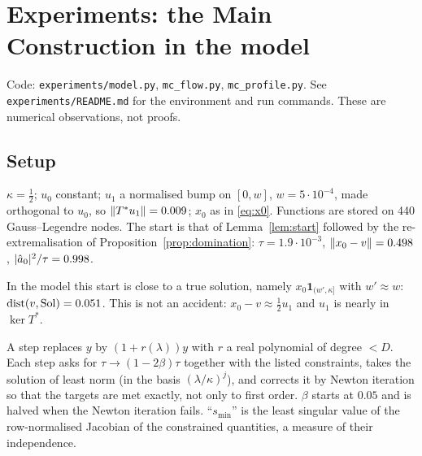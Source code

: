 \section{Experiments: the Main Construction in the model}\label{sec:experiments}

Code: \texttt{experiments/model.py}, \texttt{mc\_flow.py}, \texttt{mc\_profile.py}.
See \texttt{experiments/README.md} for the environment and run commands.
These are numerical observations, not proofs.

\subsection*{Setup}
$\kappa=\frac12$; $u_0$ constant; $u_1$ a normalised bump on $[0,w]$, $w=5\cdot10^{-4}$, made
orthogonal to $u_0$, so $\lVert T^*u_1\rVert=0.009$; $x_0$ as in \eqref{eq:x0}. Functions are stored on
440 Gauss--Legendre nodes. The start is that of Lemma~\ref{lem:start} followed by the
re-extremalisation of Proposition~\ref{prop:domination}:
$\tau=1.9\cdot10^{-3}$, $\lVert x_0-v\rVert=0.498$, $\lvert \hat a_0\rvert^2/\tau=0.998$.

\begin{remark}
In the model this start is close to a true solution, namely
$x_0\mathbf 1_{(w',\kappa]}$ with $w'\approx w$: $\operatorname{dist}(v,\operatorname{Sol})=0.051$. This is not an accident:
$x_0-v\approx\frac12u_1$ and $u_1$ is nearly in $\ker T^*$.
\end{remark}

A step replaces $y$ by $(1+r(\lambda))y$ with $r$ a real polynomial of degree $<D$. Each step
asks for $\tau\to(1-2\beta)\tau$ together with the listed constraints, takes the solution of
least norm (in the basis $(\lambda/\kappa)^j$), and corrects it by Newton iteration so that the
targets are met exactly, not only to first order. $\beta$ starts at $0.05$ and is halved when
the Newton iteration fails. ``$s_{\min}$'' is the least singular value of the row-normalised
Jacobian of the constrained quantities, a measure of their independence.

